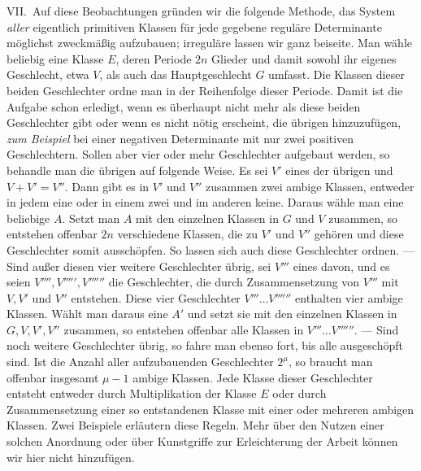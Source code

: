 VII.\ Auf diese Beobachtungen gründen wir die folgende Methode, das System \textit{aller} eigentlich primitiven Klassen für jede gegebene reguläre Determinante möglichst zweckmäßig aufzubauen; irreguläre lassen wir ganz beiseite. Man wähle beliebig eine Klasse \(E\), deren Periode \(2n\) Glieder und damit sowohl ihr eigenes Geschlecht, etwa \(V\), als auch das Hauptgeschlecht \(G\) umfasst. Die Klassen dieser beiden Geschlechter ordne man in der Reihenfolge dieser Periode. Damit ist die Aufgabe schon erledigt, wenn es überhaupt nicht mehr als diese beiden Geschlechter gibt oder wenn es nicht nötig erscheint, die übrigen hinzuzufügen, \textit{zum Beispiel} bei einer negativen Determinante mit nur zwei positiven Geschlechtern. Sollen aber vier oder mehr Geschlechter aufgebaut werden, so behandle man die übrigen auf folgende Weise. Es sei \(V'\) eines der übrigen und \(V+V'=V''\). Dann gibt es in \(V'\) und \(V''\) zusammen zwei ambige Klassen, entweder in jedem eine oder in einem zwei und im anderen keine. Daraus
wähle man eine beliebige \(A\). Setzt man \(A\) mit den einzelnen Klassen in \(G\) und \(V\) zusammen, so entstehen offenbar \(2n\) verschiedene Klassen, die zu \(V'\) und \(V''\) gehören und diese Geschlechter somit ausschöpfen. So lassen sich auch diese Geschlechter ordnen. — Sind außer diesen vier weitere Geschlechter übrig, sei \(V'''\) eines davon, und es seien \(V'''',V''''',V''''''\) die Geschlechter, die durch Zusammensetzung von \(V'''\) mit \(V,V'\) und \(V''\) entstehen. Diese vier Geschlechter \(V'''\ldots V''''''\) enthalten vier ambige Klassen. Wählt man daraus eine \(A'\) und setzt sie mit den einzelnen Klassen in \(G,V,V',V''\) zusammen, so entstehen offenbar alle Klassen in \(V'''\ldots V''''''\). — Sind noch weitere Geschlechter übrig, so fahre man ebenso fort, bis alle ausgeschöpft sind. Ist die Anzahl aller aufzubauenden Geschlechter \(2^\mu\), so braucht man offenbar insgesamt \(\mu-1\) ambige Klassen. Jede Klasse dieser Geschlechter entsteht entweder durch Multiplikation der Klasse \(E\) oder durch Zusammensetzung einer so entstandenen Klasse mit einer oder mehreren ambigen Klassen. Zwei Beispiele erläutern diese Regeln. Mehr über den Nutzen einer solchen Anordnung oder über Kunstgriffe zur Erleichterung der Arbeit können wir hier nicht hinzufügen.

